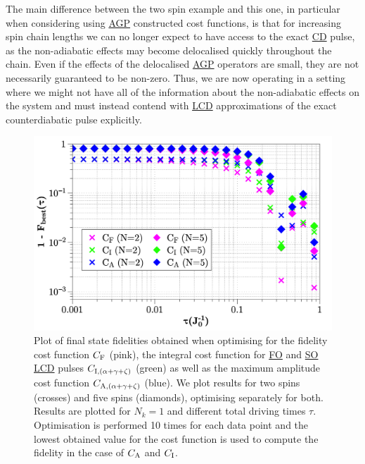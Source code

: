 \documentclass[a4paper,oneside,11pt]{book}
\newcommand{\acrref}[1]{\hyperref[acr:#1]{#1}}
\begin{document}
The main difference between the two spin example and this one, in particular when considering using \acrref{AGP} constructed cost functions, is that for increasing spin chain lengths we can no longer expect to have access to the exact \acrref{CD} pulse, as the non-adiabatic effects may become delocalised quickly throughout the chain. Even if the effects of the delocalised \acrref{AGP} operators are small, they are not necessarily guaranteed to be non-zero. Thus, we are now operating in a setting where we might not have all of the information about the non-adiabatic effects on the system and must instead contend with \acrref{LCD} approximations of the exact counterdiabatic pulse explicitly.
\begin{figure}[t]
    \centering
    \includegraphics[width=0.8\linewidth]{images/No_cd_higher_order.png} \caption[Plot of final state fidelity for the Ising spin chain for different cost functions and no counterdiabatic component in the implementation.]{Plot of final state fidelities obtained when optimising for the fidelity cost function $C_{\rm F}$ (pink), the integral cost function for \acrref{FO} and \acrref{SO} \acrref{LCD} pulses $C_{\rm I, (\alpha + \gamma + \zeta)}$ (green) as well as the maximum amplitude cost function $C_{\rm A, (\alpha + \gamma + \zeta)}$ (blue). We plot results for two spins (crosses) and five spins (diamonds), optimising separately for both. Results are plotted for $N_k = 1$ and different total driving times $\tau$. Optimisation is performed 10 times for each data point and the lowest obtained value for the cost function is used to compute the fidelity in the case of $C_{\rm A}$ and $C_{\rm I}$.}\label{fig:ising_nocd_higher_order}
\end{figure}
\end{document}
